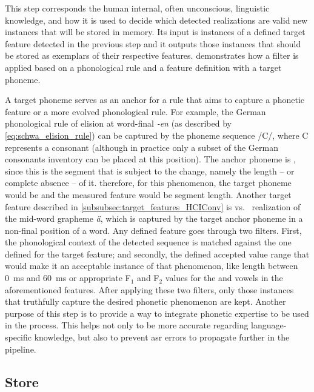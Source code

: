 This step corresponds the human internal, often unconscious, linguistic knowledge, and how it is used to decide which detected realizations are valid new instances that will be stored in memory.
Its input is instances of a defined target feature detected in the previous step and it outputs those instances that should be stored as exemplars of their respective features.
 demonstrates how a filter is applied based on a phonological rule and a feature definition with a target phoneme.

A target phoneme serves as an anchor for a rule that aims to capture a phonetic feature or a more evolved phonological rule.
For example, the German phonological rule of \textipa{[@]} elision at word-final \emph{-en} (as described by \cref{eq:schwa_elision_rule}) can be captured by the phoneme sequence /C/, where C represents a consonant (although in practice only a subset of the German consonants inventory can be placed at this position).
The anchor phoneme is \textipa{[@]}, since this is the segment that is subject to the change, namely the length -- or complete absence -- of it.
therefore, for this phenomenon, the target phoneme would be \textipa{[@]} and the measured feature would be segment length.
Another target feature described in \cref{subsubsec:target_features_HCIConv} is \textipa{[e:]} vs.\ \textipa{[E:]} realization of the mid-word grapheme \emph{ä}, which is captured by the target anchor phoneme \textipa{[E]} in a non-final position of a word.
Any defined feature goes through two filters.
First, the phonological context of the detected sequence is matched against the one defined for the target feature; and secondly, the defined accepted value range that would make it an acceptable instance of that phenomenon, like \textipa{[@]} length between \SI{0}{\milli\second} and \SI{60}{\milli\second} or appropriate F$_1$ and F$_2$ values for the \textipa{[e:]} and \textipa{[E:]} vowels in the aforementioned features.
After applying these two filters, only those instances that truthfully capture the desired phonetic phenomenon are kept.
Another purpose of this step is to provide a way to integrate phonetic expertise to be used in the process.
This helps not only to be more accurate regarding language-specific knowledge, but also to prevent \ac{asr} errors to propagate further in the pipeline.

\subsection{Store}
\label{subsec:store}

